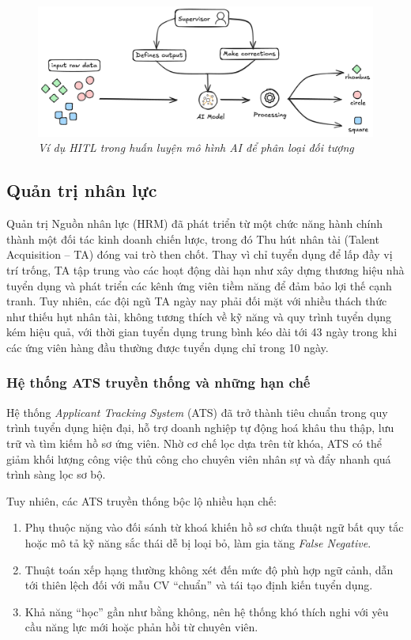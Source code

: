 \documentclass{article}
\begin{document}
\begin{figure}[H]
    \centering
    \includegraphics[width=1\linewidth]{img/hitl.png}
    \caption{\centering\textit{Ví dụ HITL trong huấn luyện mô hình AI để phân loại đối tượng}}
    \label{fig:hitl}
\end{figure}

\subsection{Quản trị nhân lực}

Quản trị Nguồn nhân lực (HRM) đã phát triển từ một chức năng hành chính thành một đối tác kinh doanh chiến lược, trong đó Thu hút nhân tài (Talent Acquisition – TA) đóng vai trò then chốt. Thay vì chỉ tuyển dụng để lấp đầy vị trí trống, TA tập trung vào các hoạt động dài hạn như xây dựng thương hiệu nhà tuyển dụng và phát triển các kênh ứng viên tiềm năng để đảm bảo lợi thế cạnh tranh. Tuy nhiên, các đội ngũ TA ngày nay phải đối mặt với nhiều thách thức như thiếu hụt nhân tài, không tương thích về kỹ năng và quy trình tuyển dụng kém hiệu quả, với thời gian tuyển dụng trung bình kéo dài tới 43 ngày trong khi các ứng viên hàng đầu thường được tuyển dụng chỉ trong 10 ngày.

\subsubsection{Hệ thống ATS truyền thống và những hạn chế}
Hệ thống \textit{Applicant Tracking System} (ATS) đã trở thành tiêu chuẩn trong quy trình tuyển dụng hiện đại, hỗ trợ doanh nghiệp tự động hoá khâu thu thập, lưu trữ và tìm kiếm hồ sơ ứng viên. Nhờ cơ chế lọc dựa trên từ khóa, ATS có thể giảm khối lượng công việc thủ công cho chuyên viên nhân sự và đẩy nhanh quá trình sàng lọc sơ bộ.

Tuy nhiên, các ATS truyền thống bộc lộ nhiều hạn chế: 
\begin{enumerate}[topsep=0pt, itemsep=2pt, leftmargin=40pt, label=\arabic*.]
    \item Phụ thuộc nặng vào đối sánh từ khoá khiến hồ sơ chứa thuật ngữ bất quy tắc hoặc mô tả kỹ năng sắc thái dễ bị loại bỏ, làm gia tăng \textit{False Negative}.
    \item Thuật toán xếp hạng thường không xét đến mức độ phù hợp ngữ cảnh, dẫn tới thiên lệch đối với mẫu CV “chuẩn” và tái tạo định kiến tuyển dụng.
    \item Khả năng “học” gần như bằng không, nên hệ thống khó thích nghi với yêu cầu năng lực mới hoặc phản hồi từ chuyên viên.
\end{enumerate}
\end{document}
